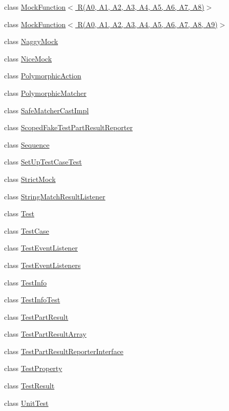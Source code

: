 \begin{DoxyCompactItemize}
\item 
class \hyperlink{classtesting_1_1MockFunction_3_01R_07A0_00_01A1_00_01A2_00_01A3_00_01A4_00_01A5_00_01A6_00_01A7_00_01A8_08_4}{Mock\+Function$<$ R(\+A0, A1, A2, A3, A4, A5, A6, A7, A8)$>$}
\item 
class \hyperlink{classtesting_1_1MockFunction_3_01R_07A0_00_01A1_00_01A2_00_01A3_00_01A4_00_01A5_00_01A6_00_01A7_00_01A8_00_01A9_08_4}{Mock\+Function$<$ R(\+A0, A1, A2, A3, A4, A5, A6, A7, A8, A9)$>$}
\item 
class \hyperlink{classtesting_1_1NaggyMock}{Naggy\+Mock}
\item 
class \hyperlink{classtesting_1_1NiceMock}{Nice\+Mock}
\item 
class \hyperlink{classtesting_1_1PolymorphicAction}{Polymorphic\+Action}
\item 
class \hyperlink{classtesting_1_1PolymorphicMatcher}{Polymorphic\+Matcher}
\item 
class \hyperlink{classtesting_1_1SafeMatcherCastImpl}{Safe\+Matcher\+Cast\+Impl}
\item 
class \hyperlink{classtesting_1_1ScopedFakeTestPartResultReporter}{Scoped\+Fake\+Test\+Part\+Result\+Reporter}
\item 
class \hyperlink{classtesting_1_1Sequence}{Sequence}
\item 
class \hyperlink{classtesting_1_1SetUpTestCaseTest}{Set\+Up\+Test\+Case\+Test}
\item 
class \hyperlink{classtesting_1_1StrictMock}{Strict\+Mock}
\item 
class \hyperlink{classtesting_1_1StringMatchResultListener}{String\+Match\+Result\+Listener}
\item 
class \hyperlink{classtesting_1_1Test}{Test}
\item 
class \hyperlink{classtesting_1_1TestCase}{Test\+Case}
\item 
class \hyperlink{classtesting_1_1TestEventListener}{Test\+Event\+Listener}
\item 
class \hyperlink{classtesting_1_1TestEventListeners}{Test\+Event\+Listeners}
\item 
class \hyperlink{classtesting_1_1TestInfo}{Test\+Info}
\item 
class \hyperlink{classtesting_1_1TestInfoTest}{Test\+Info\+Test}
\item 
class \hyperlink{classtesting_1_1TestPartResult}{Test\+Part\+Result}
\item 
class \hyperlink{classtesting_1_1TestPartResultArray}{Test\+Part\+Result\+Array}
\item 
class \hyperlink{classtesting_1_1TestPartResultReporterInterface}{Test\+Part\+Result\+Reporter\+Interface}
\item 
class \hyperlink{classtesting_1_1TestProperty}{Test\+Property}
\item 
class \hyperlink{classtesting_1_1TestResult}{Test\+Result}
\item 
class \hyperlink{classtesting_1_1UnitTest}{Unit\+Test}
\end{DoxyCompactItemize}
